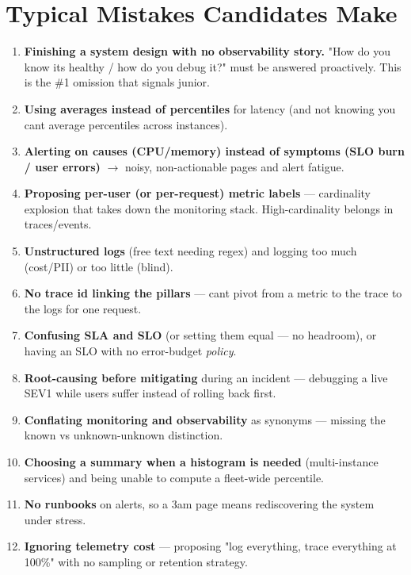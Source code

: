 \documentclass[11pt]{article}
\providecommand{\tightlist}{\setlength{\itemsep}{1pt}\setlength{\parskip}{0pt}}
\begin{document}
\section{Typical Mistakes Candidates Make}\label{typical-mistakes-candidates-make}

\begin{enumerate}
\def\labelenumi{\arabic{enumi}.}
\tightlist
\item
  \textbf{Finishing a system design with no observability story.} "How do you know it\textquotesingle s healthy / how do you debug it?" must be answered proactively. This is the \#1 omission that signals junior.
\item
  \textbf{Using averages instead of percentiles} for latency (and not knowing you can\textquotesingle t average percentiles across instances).
\item
  \textbf{Alerting on causes (CPU/memory) instead of symptoms (SLO burn / user errors)} \(\rightarrow\) noisy, non-actionable pages and alert fatigue.
\item
  \textbf{Proposing per-user (or per-request) metric labels} --- cardinality explosion that takes down the monitoring stack. High-cardinality belongs in traces/events.
\item
  \textbf{Unstructured logs} (free text needing regex) and logging too much (cost/PII) or too little (blind).
\item
  \textbf{No trace id linking the pillars} --- can\textquotesingle t pivot from a metric to the trace to the logs for one request.
\item
  \textbf{Confusing SLA and SLO} (or setting them equal --- no headroom), or having an SLO with no error-budget \emph{policy}.
\item
  \textbf{Root-causing before mitigating} during an incident --- debugging a live SEV1 while users suffer instead of rolling back first.
\item
  \textbf{Conflating monitoring and observability} as synonyms --- missing the known vs unknown-unknown distinction.
\item
  \textbf{Choosing a summary when a histogram is needed} (multi-instance services) and being unable to compute a fleet-wide percentile.
\item
  \textbf{No runbooks} on alerts, so a 3am page means rediscovering the system under stress.
\item
  \textbf{Ignoring telemetry cost} --- proposing "log everything, trace everything at 100\%" with no sampling or retention strategy.
\end{enumerate}
\end{document}
